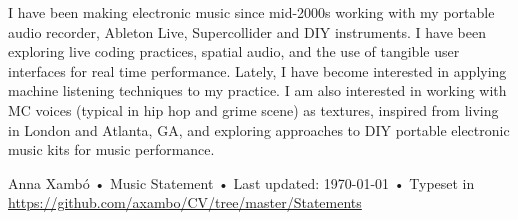 \documentclass[10pt, a4paper]{article}
\begin{document}
I have been making electronic music since mid-2000s working with my portable audio recorder, Ableton Live, Supercollider and DIY instruments. I have been exploring live coding practices, spatial audio, and the use of tangible user interfaces for real time performance. Lately, I have become interested in applying machine listening techniques to my practice. I am also interested in working with MC voices (typical in hip hop and grime scene) as textures, inspired from living in London and Atlanta, GA, and exploring approaches to DIY portable electronic music kits for music performance. 

\vfill{}

\begin{center}
{\scriptsize  Anna Xambó •\- Music Statement •\- Last updated: \today\- •\- %
Typeset in \href{http://nitens.org/taraborelli/cvtex}{
\XeTeX }\\
\href{https://github.com/axambo/CV/tree/master/Statements}{https://github.com/axambo/CV/tree/master/Statements}}
\end{center}
\end{document}
